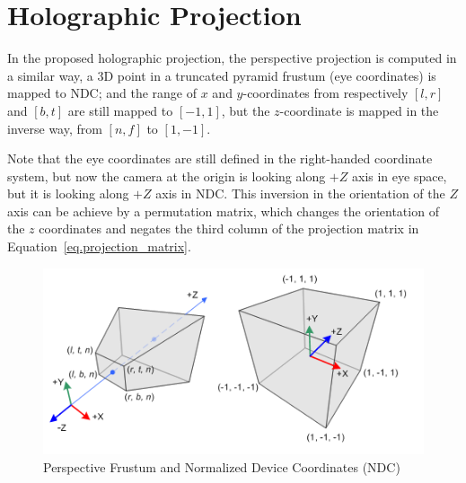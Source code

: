 \section{Holographic Projection}
\label{sec.holographic_projection}

In the proposed holographic projection, the perspective projection is computed in a similar way, a 3D point in a truncated pyramid frustum (eye coordinates) is mapped to NDC; and the range of $x$ and $y$-coordinates from respectively $[l, r]$ and $[b, t]$ are still  mapped to $[-1, 1]$, but the $z$-coordinate is mapped in the inverse way, from $[n, f]$ to $[1, -1]$. 

Note that the eye coordinates are still defined in the right-handed coordinate system, but now the camera at the origin is looking along $+Z$ axis in eye space, but it is looking along $+Z$ axis in NDC. This inversion in the orientation of the $Z$ axis can be achieve by a permutation matrix, which changes the orientation of the $z$ coordinates and negates the third column of the projection matrix in Equation~\ref{eq.projection_matrix}.


\begin{figure}[h!]
\centering
\includegraphics[width=0.9\linewidth,keepaspectratio=true]{figs/new_gl_projectionmatrix01.png}
\caption{Perspective Frustum and Normalized Device Coordinates (NDC)}
\label{fig.new_projection01}
\end{figure}





